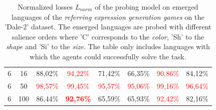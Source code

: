 \begin{table}[ht]
\begin{tabular}{cc|c|c|c|c|c|c}
        {6} & {16}  & {88,02\%}                & \textcolor{red}{94,22\%}          & {71,42\%}                & {66,35\%}                & \textcolor{red}{90,86\%} & {84,12\%}                \\
        {6} & {50}  & \textcolor{red}{98,57\%} & \textcolor{red}{99,45\%}          & \textcolor{red}{95,57\%} & \textcolor{red}{95,06\%} & \textcolor{red}{99,16\%} & \textcolor{red}{96,64\%} \\
        {6} & {100} & {86,44\%}                & \textcolor{red}{\textbf{92,76\%}} & {65,59\%}                & {65,93\%}                & \textcolor{red}{92,42\%} & {82,16\%}                \\
        \bottomrule
    \end{tabular}
    \caption{Normalized losses $L_{norm}$ of the probing model on emerged languages of the \emph{referring expression generation games} on the 'Dale-2' dataset. The emerged languages are probed with different salience orders where 'C' corresponds to the \emph{color}, 'Sh' to the \emph{shape} and 'Si' to the \emph{size}. The table only includes languages with which the agents could successfully solve the task.}
    \label{tab:probing:re-generator:dale-2}
\end{table}

